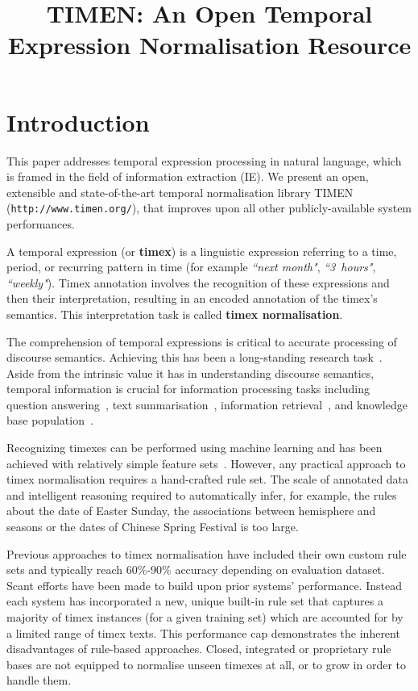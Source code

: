 \documentclass[10pt, a4paper]{article}
\title{TIMEN: An Open Temporal Expression Normalisation Resource}
\begin{document}
\maketitleabstract

\section{Introduction}

This paper addresses temporal expression processing in natural language, which is framed in the field of information extraction (IE). We present an open, extensible and state-of-the-art temporal normalisation library TIMEN (\texttt{http://www.timen.org/}), that improves upon all other publicly-available system performances.

A temporal expression (or \textbf{timex}) is a linguistic expression referring to a time, period, or recurring pattern in time (for example \emph{``next month"}, \emph{``3~hours"}, \emph{``weekly"}). Timex annotation involves the recognition of these expressions and then their interpretation, resulting in an encoded annotation of the timex's semantics. This interpretation task is called \textbf{timex normalisation}.

The comprehension of temporal expressions is critical to accurate processing of discourse semantics. Achieving this has been a long-standing research task~\cite{Mani2000,Verhagen2010-TempEval-2}. Aside from the intrinsic value it has in understanding discourse semantics, temporal information is crucial for information processing tasks including question answering~\cite{Saquete2009a}, text summarisation~\cite{Daniel2003}, information retrieval~\cite{Baeza-Yates2007TimeIR}, and knowledge base population~\cite{ji2011kbp}.

Recognizing timexes can be performed using machine learning and has been achieved with relatively simple feature sets~\cite{Llorens2011-Dynamic-Window}.
However, any practical approach to timex normalisation requires a hand-crafted rule set. The scale of annotated data and intelligent reasoning required to automatically infer, for example, the rules about the date of Easter Sunday, the associations between hemisphere and seasons or the dates of Chinese Spring Festival is too large.

Previous approaches to timex normalisation have included their own custom rule sets and typically reach 60\%-90\% accuracy depending on evaluation dataset.
Scant efforts have been made to build upon prior systems' performance. Instead each system has incorporated a new, unique built-in rule set that captures a majority of timex instances (for a given training set) which are accounted for by a limited range of timex texts. This performance cap demonstrates the inherent disadvantages of rule-based approaches. Closed, integrated or proprietary rule bases are not equipped to normalise unseen timexes at all, or to grow in order to handle them.
\end{document}
